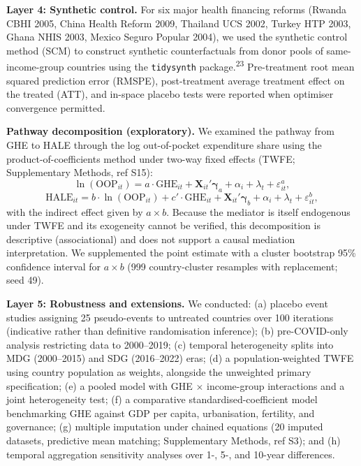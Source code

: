 \documentclass[12pt,a4paper]{article}
\begin{document}
\textbf{Layer 4: Synthetic control.} For six major health financing reforms
(Rwanda CBHI 2005, China Health Reform 2009, Thailand UCS 2002, Turkey HTP 2003,
Ghana NHIS 2003, Mexico Seguro Popular 2004), we used the synthetic control method (SCM) to construct synthetic
counterfactuals from donor pools of same-income-group countries using the
\texttt{tidysynth} package.\textsuperscript{23} Pre-treatment root mean squared prediction error (RMSPE),
post-treatment average treatment effect on the treated (ATT), and in-space
placebo tests were reported when optimiser convergence permitted.

\textbf{Pathway decomposition (exploratory).} We examined the pathway from GHE
to HALE through the log out-of-pocket expenditure share using the
product-of-coefficients method under two-way fixed effects (TWFE; Supplementary Methods, ref S15):
\begin{equation}
\ln(\text{OOP}_{it}) = a \cdot \text{GHE}_{it} + \mathbf{X}_{it}'\boldsymbol{\gamma}_a + \alpha_i + \lambda_t + \varepsilon_{it}^a ,
\end{equation}
\begin{equation}
\text{HALE}_{it} = b \cdot \ln(\text{OOP}_{it}) + c' \cdot \text{GHE}_{it} + \mathbf{X}_{it}'\boldsymbol{\gamma}_b + \alpha_i + \lambda_t + \varepsilon_{it}^b ,
\end{equation}
with the indirect effect given by $a \times b$. Because the mediator is
itself endogenous under TWFE and its exogeneity cannot be verified, this
decomposition is descriptive (associational) and does not support a causal
mediation interpretation. We supplemented the point estimate with a cluster
bootstrap 95\% confidence interval for $a \times b$ (999 country-cluster
resamples with replacement; seed 49).

\textbf{Layer 5: Robustness and extensions.} We conducted: (a) placebo event
studies assigning 25 pseudo-events to untreated countries over 100 iterations (indicative rather than definitive randomisation inference);
(b) pre-COVID-only analysis restricting data to 2000--2019; (c) temporal
heterogeneity splits into MDG (2000--2015) and SDG (2016--2022) eras; (d) a population-weighted TWFE using country population
as weights, alongside the unweighted primary specification; (e) a pooled
model with GHE $\times$ income-group interactions and a joint
heterogeneity test; (f) a comparative standardised-coefficient model
benchmarking GHE against GDP per capita, urbanisation, fertility, and
governance; (g) multiple imputation under chained equations (20 imputed datasets,
predictive mean matching; Supplementary Methods, ref S3); and
(h) temporal aggregation sensitivity analyses over 1-, 5-, and 10-year
differences.
\end{document}
